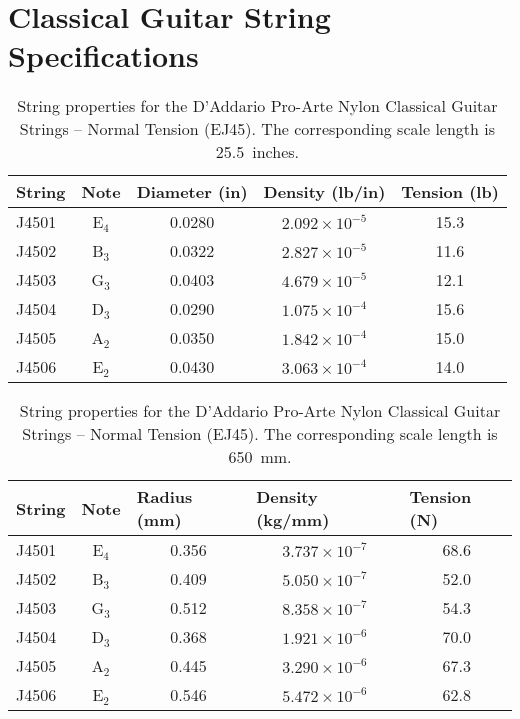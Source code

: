 %
%
%

 \section{Classical Guitar String Specifications\label{app:specs}}

\begin{table}[htbp]
  \centering
  \caption{\label{tbl:ej45_ips} String properties for the D'Addario Pro-Arte Nylon Classical Guitar Strings -- Normal Tension (EJ45). The corresponding scale length is 25.5~inches.}
    \begin{tabular}{lcccc}
    \hline \hline
    String  & Note  & \multicolumn{1}{l}{Diameter (in)} & \multicolumn{1}{l}{Density (lb/in)} & \multicolumn{1}{l}{Tension (lb)} \\
    \hline
    J4501 & E$_4$  & 0.0280 & $2.092 \times 10^{-5}$ & 15.3 \\
    J4502 & B$_3$  & 0.0322 & $2.827 \times 10^{-5}$ & 11.6 \\
    J4503 & G$_3$  & 0.0403 & $4.679 \times 10^{-5}$ & 12.1 \\
    J4504 & D$_3$  & 0.0290 & $1.075 \times 10^{-4}$ & 15.6 \\
    J4505 & A$_2$  & 0.0350 & $1.842 \times 10^{-4}$ & 15.0 \\
    J4506 & E$_2$  & 0.0430 & $3.063 \times 10^{-4}$ & 14.0 \\
    \hline
    \end{tabular}%
  \label{tab:addlabel}%
\end{table}%

\begin{table}[htbp]
  \centering
  \caption{\label{tbl:ej45_mks} String properties for the D'Addario Pro-Arte Nylon Classical Guitar Strings -- Normal Tension (EJ45). The corresponding scale length is 650~mm.}
    \begin{tabular}{lcccc}
    \hline \hline
    String  & Note  & \multicolumn{1}{l}{Radius (mm)} & \multicolumn{1}{l}{Density (kg/mm)} & \multicolumn{1}{l}{Tension (N)} \\
    \hline
    J4501 & E$_4$  & 0.356 & $3.737 \times 10^{-7}$ & 68.6 \\
    J4502 & B$_3$  & 0.409 & $5.050 \times 10^{-7}$ & 52.0 \\
    J4503 & G$_3$  & 0.512 & $8.358 \times 10^{-7}$ & 54.3 \\
    J4504 & D$_3$  & 0.368 & $1.921 \times 10^{-6}$ & 70.0 \\
    J4505 & A$_2$  & 0.445 & $3.290 \times 10^{-6}$ & 67.3 \\
    J4506 & E$_2$  & 0.546 & $5.472 \times 10^{-6}$ & 62.8 \\
    \hline
    \end{tabular}%
  \label{tab:addlabel}%
\end{table}%

